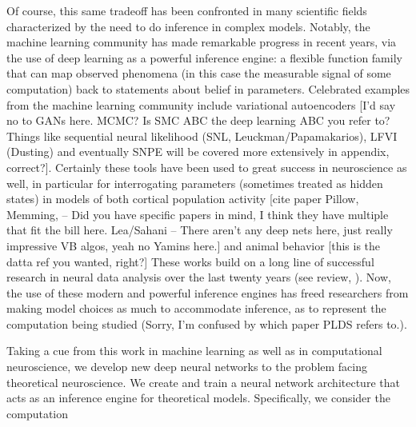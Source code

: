 \documentclass[11pt]{article}
\begin{document}
Of course, this same tradeoff has been confronted in many scientific fields characterized by the need to do inference in complex models.  Notably, the machine learning community has made remarkable progress in recent years, via the use of deep learning as a powerful inference engine: a flexible function family that can map observed phenomena (in this case the measurable signal of some computation) back to statements about belief in parameters.  Celebrated examples from the machine learning community include variational autoencoders \cite{kingma2013auto, rezende2015variational} [I'd say no to GANs here. MCMC?  Is SMC ABC the deep learning ABC you refer to? Things like sequential neural likelihood (SNL, Leuckman/Papamakarios), LFVI (Dusting) and eventually SNPE will be covered more extensively in appendix, correct?].  Certainly these tools have been used to great success in neuroscience as well, in particular for interrogating parameters (sometimes treated as hidden states) in models of both cortical population activity \cite{gao2016linear, pandarinath2018inferring} [cite paper Pillow, Memming, -- Did you have specific papers in mind, I think they have multiple that fit the bill here. Lea/Sahani -- There aren't any deep nets here, just really impressive VB algos, yeah no Yamins here.]  and animal behavior \cite{wiltschko2015mapping, johnson2016composing, batty2019behavenet}  [this is the datta ref you wanted, right?] These works build on a long line of successful research in neural data analysis over the last twenty years \cite{kass2001spike, brown1998statistical, paninski2004maximum, byron2009gaussian, latimer2015single, duncker2019learning} (see review, \cite{paninski2018neural}).  Now, the use of these modern and powerful inference engines has freed researchers from  making model choices as much to accommodate inference, as to represent the computation being studied \cite{gao2015high} (Sorry, I'm confused by which paper PLDS refers to.).

Taking a cue from this work in machine learning as well as in computational neuroscience, we develop new deep neural networks to the problem facing theoretical neuroscience.   We create and train a neural network architecture that acts as an inference engine for theoretical models.  Specifically, we consider the computation 

 
\end{document}
